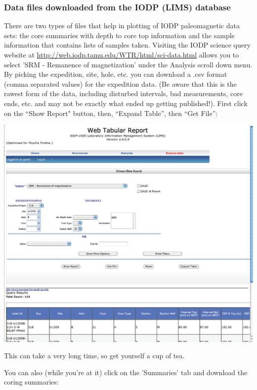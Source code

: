 \documentclass[11pt]{book}
\begin{document}
{
\subsubsection{Data files downloaded from the IODP (LIMS) database}


There are two types of files that help in plotting of IODP paleomagnetic data sets: the core summaries with depth to core top information and the sample information that contains lists of samples taken.  
Visiting the IODP science query website at \url{http://web.iodp.tamu.edu/WTR/html/sci-data.html} allows you to 
select 'SRM - Remanence of magnetization' under the Analysis scroll down menu.  By picking the expedition, site, hole, etc. you can download a  .csv format (comma separated values) for the expedition data.  (Be aware that this is the rawest form of the data, including disturbed intervals, bad measurements, core ends, etc. and may not be exactly what ended up getting published!).   First click on the ``Show Report" button, then, ``Expand Table'', then ``Get File'':

\includegraphics[width=15cm]{EPSfiles/WebTabular_srm.eps}

This can take a very long time, so get yourself a cup of tea.  

You can also (while you're at it) click on the 'Summaries' tab and download the coring summaries:

}
\end{document}
